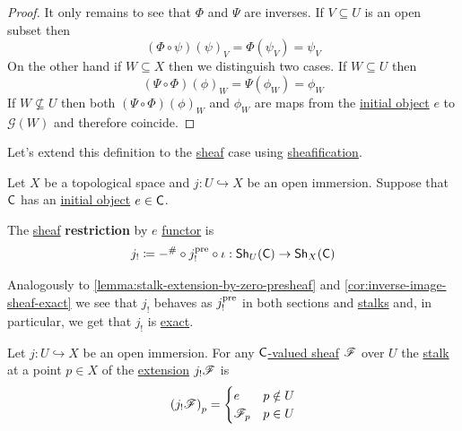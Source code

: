 \documentclass[../../main]{subfiles}
\begin{document}
\begin{proof}
  It only remains to see that \(\Phi\) and \(\Psi\) are inverses.
  If \(V \subseteq U\) is an open subset then
  \begin{equation*}
    \left( \Phi \circ \psi \right)(\psi)_{V} = \Phi \left( \psi_{V} \right) = \psi_{V}
  \end{equation*}
  On the other hand if \(W \subseteq X\) then we distinguish two cases.
  If \(W \subseteq U\) then
  \begin{equation*}
    \left( \Psi \circ \Phi \right)(\phi)_{W} = \Psi \left( \phi_{W} \right) = \phi_{W}
  \end{equation*}
  If \(W \not\subseteq U\) then both \(\left( \Psi \circ \Phi \right)(\phi)_{W}\) and \(\phi_{W}\) are maps from the \hyperref[def:initial-terminal-object]{initial object} \(e\) to \(\mathcal{G}(W)\) and therefore coincide.
\end{proof}

Let's extend this definition to the \hyperref[def:sheaf]{sheaf} case using \hyperref[def:sheafification]{sheafification}.
\begin{definition}\label{def:extension-by-zero-sheaf}
  Let \(X\) be a topological space and \(j\colon U \hookrightarrow X\) be an open immersion.
  Suppose that \(\mathsf{C}\) has an \hyperref[def:initial-terminal-object]{initial object} \(e \in \mathsf{C}\).

  The \hyperref[def:sheaf]{sheaf} \textbf{restriction} by \(e\) \hyperref[def:functor]{functor} is
  \begin{equation*}
    j_{!} \coloneq -^{\#} \circ j_{!}^{\operatorname*{pre}} \circ \iota: \mathsf{Sh}_{U}(\mathsf{C}) \to \mathsf{Sh}_{X}(\mathsf{C})
  \end{equation*}
\end{definition}

Analogously to \autoref{lemma:stalk-extension-by-zero-presheaf} and \autoref{cor:inverse-image-sheaf-exact} we see that \(j_{!}\) behaves as \(j_{!}^{\operatorname*{pre}}\) in both sections and \hyperref[def:stalk]{stalks} and, in particular, we get that \(j_{!}\) is \hyperref[def:exact-functor]{exact}.

\begin{lemma}\label{lemma:stalk-extension-by-zero-sheaf}
  Let \(j\colon U \hookrightarrow X\) be an open immersion.
  For any \hyperref[def:sheaf]{\(\mathsf{C}\)-valued sheaf} \(\mathscr{F}\) over \(U\) the \hyperref[def:stalk]{stalk} at a point \(p \in X\) of the \hyperref[def:extension-by-zero-sheaf]{extension} \(j_{!}\mathscr{F}\) is
  \begin{equation*}
    \left( j_{!}\mathscr{F} \right)_{p} = \begin{cases}
      e & p \notin U \\
      \mathscr{F}_{p} & p \in U
    \end{cases}
  \end{equation*}
\end{lemma}
\end{document}
